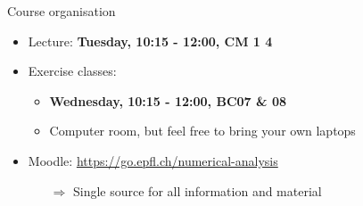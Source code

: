 \begin{frame}{Course organisation}
    \begin{itemize}
        \item \alert{Lecture}: \textbf{Tuesday, 10:15 - 12:00, CM 1 4}
        \vspace{1.5em}
        \item \alert{Exercise classes}:
            \begin{itemize}
                \item \textbf{Wednesday, 10:15 - 12:00, BC07 \& 08}
                \item Computer room, but feel free to bring your own laptops
            \end{itemize}
        \vspace{1.5em}
        \item \alert{Moodle:} \url{https://go.epfl.ch/numerical-analysis}
            \begin{itemize}
                \item[$\Rightarrow$] Single source for all information and material
            \end{itemize}
    \end{itemize}
\end{frame}


